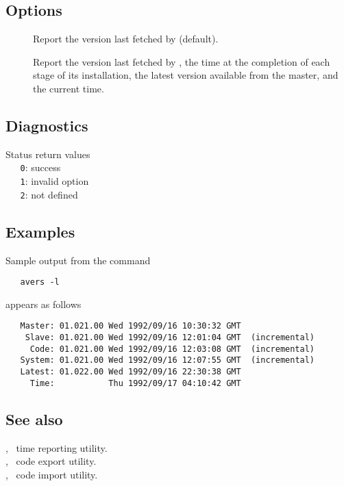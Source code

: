 \subsection*{Options}

\begin{description}
\item[]
   Report the version last fetched by  (default).

\item[]
   Report the version last fetched by , the time at the
   completion of each stage of its installation, the latest version available
   from the master, and the current time.
\end{description}

\subsection*{Diagnostics}

Status return values
\\ \verb+   0+: success
\\ \verb+   1+: invalid option
\\ \verb+   2+:  not defined

\subsection*{Examples}

Sample output from the command

\begin{verbatim}
   avers -l
\end{verbatim}

\noindent
appears as follows

\begin{verbatim}
   Master: 01.021.00 Wed 1992/09/16 10:30:32 GMT
    Slave: 01.021.00 Wed 1992/09/16 12:01:04 GMT  (incremental)
     Code: 01.021.00 Wed 1992/09/16 12:03:08 GMT  (incremental)
   System: 01.021.00 Wed 1992/09/16 12:07:55 GMT  (incremental)
   Latest: 01.022.00 Wed 1992/09/16 22:30:38 GMT
     Time:           Thu 1992/09/17 04:10:42 GMT
\end{verbatim}

\subsection*{See also}

, \aipspp\ time reporting utility.\\
, \aipspp\ code export utility.\\
, \aipspp\ code import utility.

